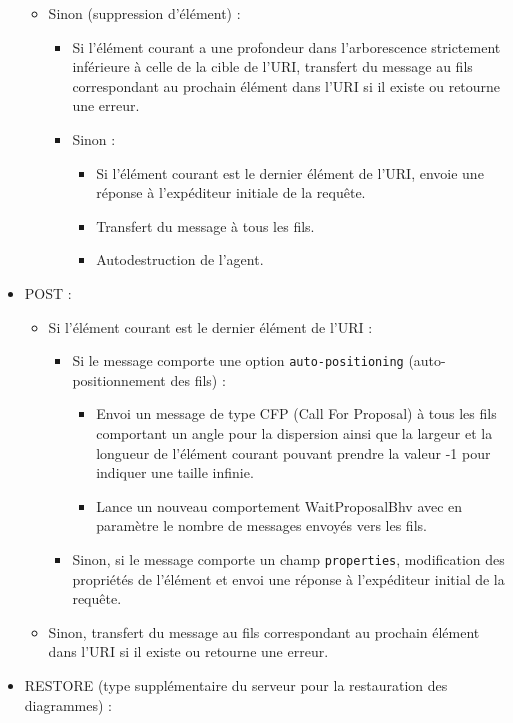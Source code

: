 \begin{itemize}
\begin{itemize}
\begin{itemize}
		\end{itemize}
		\item Sinon (suppression d'élément) :
		\begin{itemize}
			\item Si l'élément courant a une profondeur dans l'arborescence strictement inférieure à celle de la cible de l'URI, transfert du message au fils correspondant au prochain élément dans l'URI si il existe ou retourne une erreur.
			\item Sinon :
			\begin{itemize}
				\item Si l'élément courant est le dernier élément de l'URI, envoie une réponse à l'expéditeur initiale de la requête.
				\item Transfert du message à tous les fils.
				\item Autodestruction de l'agent.
			\end{itemize}
		\end{itemize}
	\end{itemize}
	\item POST :
	\begin{itemize}
		\item Si l'élément courant est le dernier élément de l'URI :
		\begin{itemize}
			\item Si le message comporte une option \lstinline$auto-positioning$ (auto-positionnement des fils) :
			\begin{itemize}
				\item Envoi un message de type CFP (Call For Proposal) à tous les fils comportant un angle pour la dispersion ainsi que la largeur et la longueur de l'élément courant pouvant prendre la valeur -1 pour indiquer une taille infinie.
				\item Lance un nouveau comportement WaitProposalBhv avec en paramètre le nombre de messages envoyés vers les fils.
			\end{itemize}
			\item Sinon, si le message comporte un champ \lstinline$properties$, modification des propriétés de l'élément et envoi une réponse à l'expéditeur initial de la requête.
		\end{itemize}
		\item Sinon, transfert du message au fils correspondant au prochain élément dans l'URI si il existe ou retourne une erreur.
	\end{itemize}
	\item RESTORE (type supplémentaire du serveur pour la restauration des diagrammes) :

\end{itemize}

